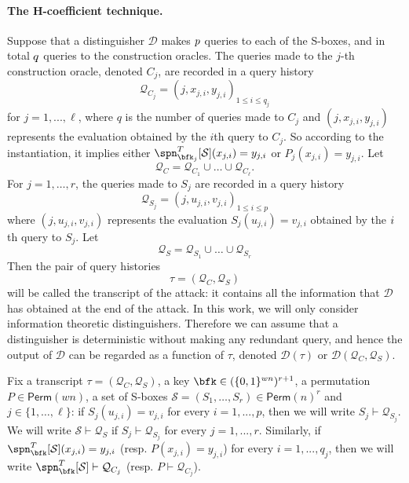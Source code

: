 
%

\paragraph{The H-coefficient technique.}

Suppose that a distinguisher $\mathcal{D}$ makes $\mathnormal{p}$ queries to each of the S-boxes, and in total $\mathnormal{q}$ queries to the construction oracles. The queries made to the $j$-th construction oracle, denoted $C_j$, are recorded in a query history
%
$$
\mathcal{Q}_{C_j} = (j,x_{j,i},y_{j,i})_{1 \leq i \leq q_j}
$$
%
for $j=1,...,\ell$, where $q$ is the number of queries made to $C_j$ and $(j,x_{j,i},y_{j,i})$ represents the evaluation obtained by the $i$th query to $C_j$. So according to the instantiation, it implies either $\spn_{\bfk_j}^T[\mathcal{S}](x_{j,i}) = y_{j,i}$  or ${P}_j(x_{j,i}) = y_{j,i}$. Let
%
$$\mathcal{Q}_{C}=\mathcal{Q}_{C_1}\cup\ldots\cup\mathcal{Q}_{C_\ell}.$$
%
For $j = 1,\ldots,r$, the queries made to $S_j$ are recorded in a query history
%
$$
\mathcal{Q}_{S_j} = (j, u_{j,i}, v_{j,i})_{1 \leq i \leq p}
$$
%
where $(j, u_{j,i}, v_{j,i})$  represents the evaluation $S_j(u_{j,i}) = v_{j,i}$ obtained by the $\mathnormal{i}$th query to $S_j$. Let
%
$$
\mathcal{Q}_{S}=\mathcal{Q}_{S_1} \cup \ldots \cup \mathcal{Q}_{S_r}
$$
%
Then the pair of query histories
%
$$
\tau = (\mathcal{Q}_{C}, \mathcal{Q}_{S})
$$
%
will be called the transcript of the attack: it contains all the information that $\mathcal{D}$ has obtained at the end of the attack. In this work, we will only consider
information theoretic distinguishers. Therefore we can assume that a distinguisher is deterministic without making any redundant query, and hence the output of  $\mathcal{D}$  can be regarded as a function of $\tau$, denoted $\mathcal{D}(\tau)$ or $\mathcal{D}(\mathcal{Q}_C, \mathcal{Q}_S)$.





Fix a transcript $\tau = (\mathcal{Q}_C,\mathcal{Q}_S)$, a key $\bfk \in(\{0,1\}^{wn})^{r+1}$, a permutation ${P} \in {\mathsf{Perm}}(wn)$,  a set of S-boxes $\mathcal{S}=(S_1, \ldots  ,S_r) \in \mathsf{Perm}(n)^r $ and $j \in \{1, \ldots, \ell \}$: if $S_j(u_{j,i})=v_{j,i}$ for every $i = 1, . . . , p$, then we will write $S_j\vdash\mathcal{Q}_{S_j}$. We will write $\mathcal{S}\vdash\mathcal{Q}_S$ if $S_j\vdash\mathcal{Q}_{S_j}$ for every $j = 1, . . . , r$. Similarly, if
$\spn_{\bfk}^T[\mathcal{S}](x_{j,i}) = y_{j,i}$ (resp. ${P}(x_{j,i}) = y_{j,i}$) for every $i = 1, . . . , q_j$, then we will write $\spn_{\bfk}^T[\mathcal{S}]\vdash\mathcal{Q}_{C_j}$ (resp. ${P}\vdash\mathcal{Q}_{C_j}$).


